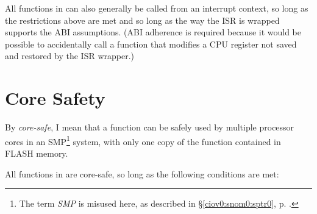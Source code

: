 All functions in \emph{\productbasenameshort{}} can also 
generally be called from an interrupt context, so long as 
the restrictions above are met and so long as the way the 
ISR is wrapped supports the ABI assumptions\@.  (ABI 
adherence is required because it would be possible to 
accidentally call a \emph{\productbasenameshort{}} function 
that modifies a CPU register not saved and restored by the 
ISR wrapper.) 


\section{Core Safety}
\label{cldd0:scsf0}

By \emph{core-safe}, I mean that a function 
can be safely used by multiple processor cores in an 
SMP\footnote{The term \emph{SMP} is misused here, as 
described in \S{}\ref{ciov0:snom0:sptr0}, p.  
\pageref{ciov0:snom0:sptr0}.} system, with only one copy of 
the function contained in FLASH memory.  

All functions in \emph{\productbasenameshort{}} are core-safe,
so long as the following conditions are met:

